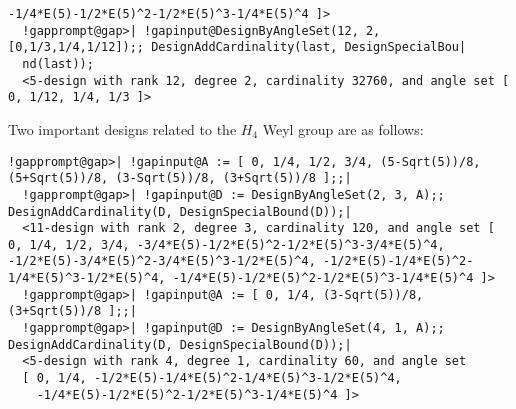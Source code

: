 \documentclass[a4paper,11pt]{report}
\begin{document}
{{\begin{Verbatim}[commandchars=!@|,fontsize=\small,frame=single,label=Example]
    -1/4*E(5)-1/2*E(5)^2-1/2*E(5)^3-1/4*E(5)^4 ]>
  !gapprompt@gap>| !gapinput@DesignByAngleSet(12, 2, [0,1/3,1/4,1/12]);; DesignAddCardinality(last, DesignSpecialBou|
  nd(last));
  <5-design with rank 12, degree 2, cardinality 32760, and angle set [ 0, 1/12, 1/4, 1/3 ]>
\end{Verbatim}
 Two important designs related to the $H_4$ Weyl group are as follows: 
\begin{Verbatim}[commandchars=!@|,fontsize=\small,frame=single,label=Example]
  !gapprompt@gap>| !gapinput@A := [ 0, 1/4, 1/2, 3/4, (5-Sqrt(5))/8, (5+Sqrt(5))/8, (3-Sqrt(5))/8, (3+Sqrt(5))/8 ];;|
  !gapprompt@gap>| !gapinput@D := DesignByAngleSet(2, 3, A);; DesignAddCardinality(D, DesignSpecialBound(D));|
  <11-design with rank 2, degree 3, cardinality 120, and angle set [ 0, 1/4, 1/2, 3/4, -3/4*E(5)-1/2*E(5)^2-1/2*E(5)^3-3/4*E(5)^4, -1/2*E(5)-3/4*E(5)^2-3/4*E(5)^3-1/2*E(5)^4, -1/2*E(5)-1/4*E(5)^2-1/4*E(5)^3-1/2*E(5)^4, -1/4*E(5)-1/2*E(5)^2-1/2*E(5)^3-1/4*E(5)^4 ]>
  !gapprompt@gap>| !gapinput@A := [ 0, 1/4, (3-Sqrt(5))/8, (3+Sqrt(5))/8 ];;|
  !gapprompt@gap>| !gapinput@D := DesignByAngleSet(4, 1, A);; DesignAddCardinality(D, DesignSpecialBound(D));|
  <5-design with rank 4, degree 1, cardinality 60, and angle set
  [ 0, 1/4, -1/2*E(5)-1/4*E(5)^2-1/4*E(5)^3-1/2*E(5)^4,
    -1/4*E(5)-1/2*E(5)^2-1/2*E(5)^3-1/4*E(5)^4 ]> 
\end{Verbatim}
 }

 }

 
\end{document}
